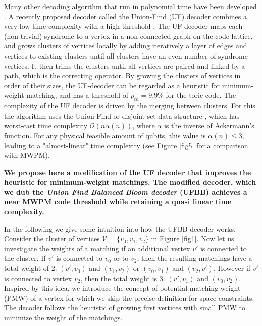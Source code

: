 \documentclass[11pt, a4paper, twoside, titlepage ,dvipsnames]{report}
\begin{document}
Many other decoding algorithm that run in polynomial time have been developed \cite{}. A recently proposed decoder called the Union-Find (UF) decoder combines a very low time complexity with a high threshold \cite{delfosse2017linear, delfosse2017almost}. 
The UF decoder maps each (non-trivial) syndrome to a vertex in a non-connected graph on the code lattice, and grows clusters of vertices locally by adding iteratively a layer of edges and vertices to existing clusters until 
all clusters have an even number of syndrome vertices. It then trims the clusters until all vertices are paired and linked by a path, which is the correcting operator. 
By growing the clusters of vertices in order of their sizes, the UF-decoder can be regarded as a heuristic for minimum-weight matching, and has a threshold of $p_{th} = 9.9\%$ for the toric code. 
The complexity of the UF decoder is driven by the merging between clusters. For this the algorithm uses the Union-Find or disjoint-set data structure \cite{tarjan1975efficiency}, which has worst-cast time complexity $\mathcal{O}(n\alpha(n))$, where $\alpha$ is the inverse of Ackermann's function. For any physical feasible amount of qubits, this value is $\alpha(n) \leq 3$, leading to a "almost-linear" time complexity (see Figure \ref{fig5} for a comparison with MWPM).

\textbf{We propose here a modification of the UF decoder that improves the heuristic for minimum-weight matchings. The modified decoder, which we dub the \emph{Union Find Balanced Bloom decoder} (UFBB) achieves a near MWPM code threshold while retaining a quasi linear time complexity.}

In the following we give some intuition into how the UFBB decoder works. Consider the cluster of vertices $\mathcal{V}=\{v_0,v_1,v_2\}$ in Figure \ref{fig1}. Now let us investigate the weights of a matching if an additional vertex $v'$ is connected to the cluster. 
If $v'$ is connected to $v_0$ or to $v_2$, then the resulting matchings have a total weight of 2: $(v',v_0)$ and $(v_1,v_2)$ or $(v_0,v_1)$ and $(v_2,v')$. However if $v'$ is connected to vertex $v_2$, then the total weight is 3: $(v', v_1)$ and $(v_0, v_2)$. Inspired by this idea, we introduce the concept of potential matching weight (PMW) of a vertex for which we skip the precise definition for space constraints. The decoder follows the heuristic of growing first vertices with small PMW to minimize the weight of the matchings. 
\end{document}
